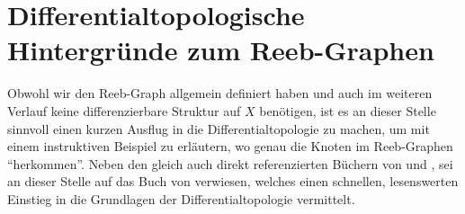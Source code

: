\section{Differentialtopologische Hintergründe zum Reeb-Graphen} %
\label{sec:background_reeb}
Obwohl wir den Reeb-Graph allgemein definiert haben und auch im weiteren Verlauf keine differenzierbare Struktur auf $X$ benötigen, ist es an dieser Stelle sinnvoll einen kurzen Ausflug in die Differentialtopologie zu machen, um mit einem instruktiven Beispiel zu erläutern, wo genau die Knoten im Reeb-Graphen \enquote{herkommen}.
Neben den gleich auch direkt referenzierten Büchern von \textcite{compTopo} und \textcite{MilnorMorse}, sei an dieser Stelle auf das Buch  von \textcite{Miln} verwiesen, welches einen schnellen, lesenswerten Einstieg in die Grundlagen der Differentialtopologie vermittelt.

